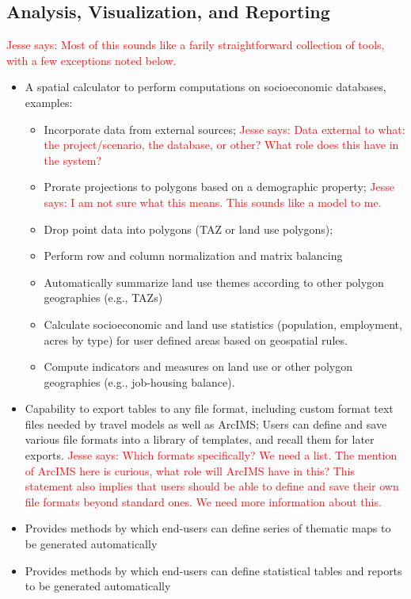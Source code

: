 \documentclass[titlepage]{article}
\begin{document}
\subsection{Analysis, Visualization, and Reporting}
\textcolor{red}{Jesse says: Most of this sounds like a farily straightforward collection of tools, with a few exceptions noted below.}
\begin{itemize}
	\item A spatial calculator to perform computations on socioeconomic databases, examples:
		\begin{itemize}
			\item Incorporate data from external sources;
				\textcolor{red}{Jesse says: Data external to what: the project/scenario, the database, or other?  What role does this have in the system?}
			\item Prorate projections to polygons based on a demographic property;
				\textcolor{red}{Jesse says: I am not sure what this means.  This sounds like a model to me.}
			\item Drop point data into polygons (TAZ or land use polygons);
			\item Perform row and column normalization and matrix balancing
			\item Automatically summarize land use themes according to other polygon geographies (e.g., TAZs)
			\item Calculate socioeconomic and land use statistics (population, employment, acres by type) for user defined areas based on geospatial rules.
			\item Compute indicators and measures on land use or other polygon geographies (e.g., job-housing balance).
		\end{itemize}
	\item Capability to export tables to any file format, including custom format text files needed by travel models as well as ArcIMS; Users can define and save various file formats into a library of templates, and recall them for later exports.
		\textcolor{red}{Jesse says: Which formats specifically?  We need a list.  The mention of ArcIMS here is curious, what role will ArcIMS have in this?  This statement also implies that users should be able to define and save their own file formats beyond standard ones.  We need more information about this.}
	\item Provides methods by which end-users can define series of thematic maps to be generated automatically
	\item Provides methods by which end-users can define statistical tables and reports to be generated automatically
\end{itemize}
\end{document}
